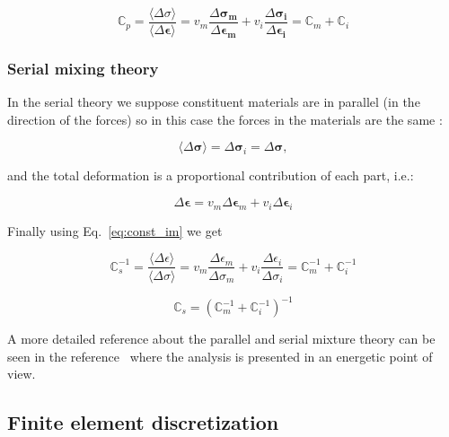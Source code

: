 \documentclass[review]{elsarticle}
\begin{document}
\begin{equation}
\mathbb{C}_p = \frac{\langle\Delta \sigma\rangle}{\langle\Delta \bm{\epsilon}\rangle} = 
v_m\frac{\Delta \bm{\sigma_m}}{\Delta \bm{\epsilon_m}} +
v_i\frac{\Delta \bm{\sigma_i}}{\Delta \bm{\epsilon_i}} = 
\mathbb{C}_m + \mathbb{C}_i
\label{eq:parallel_mix}
\end{equation}


\subsubsection{Serial mixing theory}
In the serial theory we suppose constituent materials are in 
parallel (in the direction of the forces) so in
this case the forces in the materials are the same :

\begin{equation}
\langle \Delta \bm{\sigma} \rangle= \Delta \bm{\sigma}_i = \Delta \bm{\sigma},
\end{equation}

\noindent
and the total deformation is a proportional contribution of each part, i.e.:

\begin{equation}
\Delta \bm{\epsilon} = v_m \Delta \bm{\epsilon}_m + v_i \Delta \bm{\epsilon}_i
\end{equation}

Finally using Eq.~\ref{eq:const_im} we get

\begin{equation*}
\mathbb{C}_s^{-1} = \frac{\langle\Delta \epsilon\rangle}{\langle\Delta \sigma\rangle} = 
v_m\frac{\Delta \epsilon_m}{\Delta \sigma_m} +
v_i\frac{\Delta \epsilon_i}{\Delta \sigma_i} = 
\mathbb{C}_m^{-1} + \mathbb{C}_i^{-1}
\end{equation*}

\begin{equation}
\mathbb{C}_s =
\left( \mathbb{C}_m^{-1} + \mathbb{C}_i^{-1} \right)^{-1}
\label{eq:serial_mix}
\end{equation}

A more detailed reference about the parallel and serial mixture theory can be seen in the
reference~\cite{oller-composites} where the analysis is presented in an
energetic point of view.


\subsection{Finite element discretization}
\end{document}
